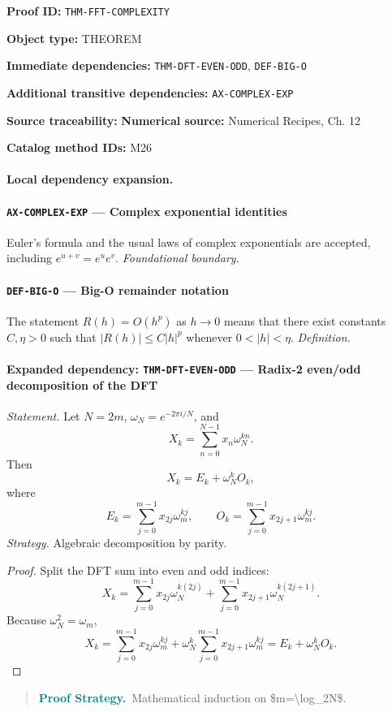 \documentclass[10pt]{article}
\newcommand{\pidraw}[1]{\begingroup\urlstyle{tt}\nolinkurl{#1}\endgroup}
\theoremstyle{definition}
\theoremstyle{remark}
\newenvironment{proofstrategy}
{\begin{quote}\small\noindent\textbf{\textcolor{teal}{Proof Strategy.}}\ }
{\end{quote}}
\newcommand{\meta}[2]{\noindent\textbf{#1:} #2\par}
\begin{document}
\meta{Proof ID}{\pidraw{THM-FFT-COMPLEXITY}}
\meta{Object type}{THEOREM}
\meta{Immediate dependencies}{\pidraw{THM-DFT-EVEN-ODD}, \pidraw{DEF-BIG-O}}
\meta{Additional transitive dependencies}{\pidraw{AX-COMPLEX-EXP}}
\meta{Source traceability}{\textbf{Numerical source:} Numerical Recipes, Ch. 12}
\meta{Catalog method IDs}{M26}

\paragraph{Local dependency expansion.}

\paragraph{\pidraw{AX-COMPLEX-EXP} --- Complex exponential identities}
Euler's formula and the usual laws of complex exponentials are accepted, including $e^{u+v}=e^u e^v$.
\textit{Foundational boundary.}

\paragraph{\pidraw{DEF-BIG-O} --- Big-O remainder notation}
The statement $R(h)=O(h^p)$ as $h\to0$ means that there exist constants $C,\eta>0$ such that $|R(h)|\le C|h|^p$ whenever $0<|h|<\eta$.
\textit{Definition.}

\paragraph{Expanded dependency: \pidraw{THM-DFT-EVEN-ODD} --- Radix-2 even/odd decomposition of the DFT}
\textit{Statement.} Let $N=2m$, $\omega_N=e^{-2\pi i/N}$, and
\[
X_k=\sum_{n=0}^{N-1}x_n\omega_N^{kn}.
\]
Then
\[
X_k=E_k+\omega_N^k O_k,
\]
where
\[
E_k=\sum_{j=0}^{m-1}x_{2j}\omega_m^{kj},
\qquad
O_k=\sum_{j=0}^{m-1}x_{2j+1}\omega_m^{kj}.
\]
\textit{Strategy.} Algebraic decomposition by parity.
\begin{proof}Split the DFT sum into even and odd indices:
\[
X_k=
\sum_{j=0}^{m-1}x_{2j}\omega_N^{k(2j)}
+
\sum_{j=0}^{m-1}x_{2j+1}\omega_N^{k(2j+1)}.
\]
Because $\omega_N^2=\omega_m$,
\[
X_k=
\sum_{j=0}^{m-1}x_{2j}\omega_m^{kj}
+
\omega_N^k\sum_{j=0}^{m-1}x_{2j+1}\omega_m^{kj}
=
E_k+\omega_N^kO_k.
\]\end{proof}

\begin{proofstrategy}Mathematical induction on \$m=\textbackslash{}log\_2N\$.\end{proofstrategy}
\end{document}
